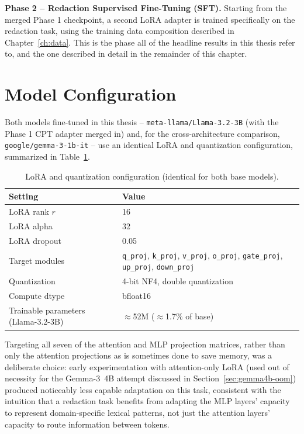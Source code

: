 \documentclass[12pt,a4paper]{report}
\begin{document}
\textbf{Phase 2 -- Redaction Supervised Fine-Tuning (SFT).} Starting from the merged Phase 1 checkpoint, a second LoRA adapter is trained specifically on the redaction task, using the training data composition described in Chapter~\ref{ch:data}. This is the phase all of the headline results in this thesis refer to, and the one described in detail in the remainder of this chapter.

\section{Model Configuration}
\label{sec:model-config}

Both models fine-tuned in this thesis -- \texttt{meta-llama/Llama-3.2-3B} (with the Phase 1 CPT adapter merged in) and, for the cross-architecture comparison, \texttt{google/gemma-3-1b-it} -- use an identical LoRA and quantization configuration, summarized in Table~\ref{tab:model-config}.

\begin{table}[htbp]
\centering
\caption{LoRA and quantization configuration (identical for both base models).}
\label{tab:model-config}
\begin{tabular}{p{5.2cm}p{7.8cm}}
\toprule
Setting & Value \\
\midrule
LoRA rank $r$ & 16 \\
LoRA alpha & 32 \\
LoRA dropout & 0.05 \\
Target modules & \texttt{q\_proj}, \texttt{k\_proj}, \texttt{v\_proj}, \texttt{o\_proj}, \texttt{gate\_proj}, \texttt{up\_proj}, \texttt{down\_proj} \\
Quantization & 4-bit NF4, double quantization \\
Compute dtype & bfloat16 \\
Trainable parameters (Llama-3.2-3B) & $\approx$52M ($\approx$1.7\% of base) \\
\bottomrule
\end{tabular}
\end{table}

Targeting all seven of the attention and MLP projection matrices, rather than only the attention projections as is sometimes done to save memory, was a deliberate choice: early experimentation with attention-only LoRA (used out of necessity for the Gemma-3~4B attempt discussed in Section~\ref{sec:gemma4b-oom}) produced noticeably less capable adaptation on this task, consistent with the intuition that a redaction task benefits from adapting the MLP layers' capacity to represent domain-specific lexical patterns, not just the attention layers' capacity to route information between tokens.
\end{document}

